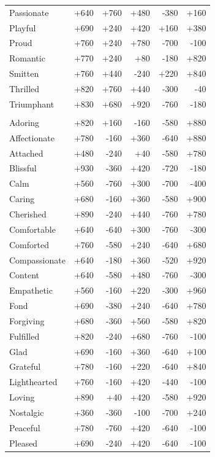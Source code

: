 \begin{longtable}{@{}p{}rrrrr}
Passionate & +640 & +760 & +480 & -380 & +160 \\
Playful & +690 & +240 & +420 & +160 & +380 \\
Proud & +760 & +240 & +780 & -700 & -100 \\
Romantic & +770 & +240 & +80 & -180 & +820 \\
Smitten & +760 & +440 & -240 & +220 & +840 \\
Thrilled & +820 & +760 & +440 & -300 & -40 \\
Triumphant & +830 & +680 & +920 & -760 & -180 \\
\addlinespace[2pt]\multicolumn{6}{@{}l}{\textbf{Calm Positive} ($n=39$)} \\
Adoring & +820 & +160 & -160 & -580 & +880 \\
Affectionate & +780 & -160 & +360 & -640 & +880 \\
Attached & +480 & -240 & +40 & -580 & +780 \\
Blissful & +930 & -360 & +420 & -720 & -180 \\
Calm & +560 & -760 & +300 & -700 & -400 \\
Caring & +680 & -160 & +360 & -580 & +900 \\
Cherished & +890 & -240 & +440 & -760 & +780 \\
Comfortable & +640 & -640 & +300 & -760 & -300 \\
Comforted & +760 & -580 & +240 & -640 & +680 \\
Compassionate & +640 & -180 & +360 & -520 & +920 \\
Content & +640 & -580 & +480 & -760 & -300 \\
Empathetic & +560 & -160 & +220 & -300 & +960 \\
Fond & +690 & -380 & +240 & -640 & +780 \\
Forgiving & +680 & -360 & +560 & -580 & +820 \\
Fulfilled & +820 & -240 & +680 & -760 & -100 \\
Glad & +690 & -160 & +360 & -640 & +100 \\
Grateful & +780 & -160 & +220 & -640 & +840 \\
Lighthearted & +760 & -160 & +420 & -440 & -100 \\
Loving & +890 & +40 & +420 & -580 & +920 \\
Nostalgic & +360 & -360 & -100 & -700 & +240 \\
Peaceful & +780 & -760 & +420 & -640 & -100 \\
Pleased & +690 & -240 & +420 & -640 & -100 \\

\end{longtable}
